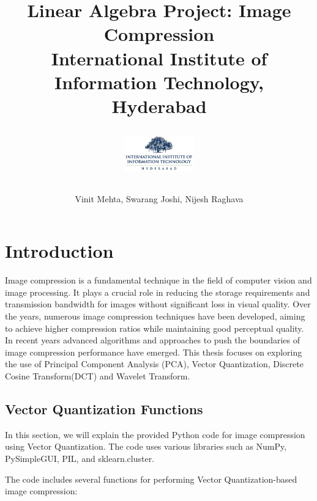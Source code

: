 \documentclass{article}
\begin{document}
\title{
    {Linear Algebra Project: Image Compression}\\
    {\large International Institute of Information Technology, Hyderabad}\\
    \author{Vinit Mehta, Swarang Joshi, Nijesh Raghava}
    \vspace{1cm}
    \includegraphics[width=3cm]{IIITH.png}
}
\date{}

\maketitle

\section{Introduction}
Image compression is a fundamental technique in the field of computer vision and image processing. It plays a crucial role in reducing the storage requirements and transmission bandwidth for images without significant loss in visual quality. Over the years, numerous image compression techniques have been developed, aiming to achieve higher compression ratios while maintaining good perceptual quality. In recent years advanced algorithms and approaches to push the boundaries of image compression performance have emerged. This thesis focuses on exploring the use of Principal Component Analysis (PCA), Vector Quantization, Discrete Cosine Transform(DCT) and Wavelet Transform.

\subsection{Vector Quantization Functions}


In this section, we will explain the provided Python code for image compression using Vector Quantization. The code uses various libraries such as NumPy, PySimpleGUI, PIL, and sklearn.cluster.



The code includes several functions for performing Vector Quantization-based image compression:
\end{document}
